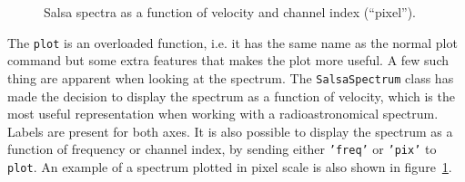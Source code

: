 \documentclass[11pt,a4paper]{article}
\begin{document}
\begin{figure}[h!]
  \centering
  \caption{Salsa spectra as a function of velocity and channel index
    (``pixel'').}
  \label{fig1}
\end{figure}

\noindent
The \texttt{plot} is an overloaded function, i.e. it has the same name
as the normal plot command but some extra features that makes the plot
more useful. A few such thing are apparent when looking at the
spectrum. The \texttt{SalsaSpectrum} class has made the decision to
display the spectrum as a function of velocity, which is the most
useful representation when working with a radioastronomical spectrum.
Labels are present for both axes. It is also possible to display the
spectrum as a function of frequency or channel index, by sending
either \texttt{'freq'} or \texttt{'pix'} to \texttt{plot}. An example
of a spectrum plotted in pixel scale is also shown in
figure~\ref{fig1}.
\end{document}
